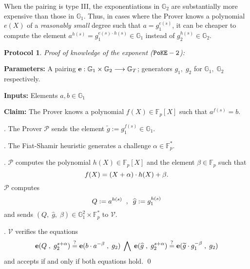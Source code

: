 \documentclass[11pt, lettersize, notitlepage, leqno, footskip=0.6cm]{article}
\newcommand{\bFp}{\mathbb{F}_p}
\newcommand{\bG}{\mathbb{G}}
\newcommand{\lra}{\longrightarrow}
\newcommand{\wti}{\widetilde}
\newcommand{\mc}{\mathcal}
\newcommand{\mb}{\mathbb}
\newcommand{\al}{\alpha}
\newcommand{\be}{\beta}
\newcommand{\what}{\widehat}
\newcommand{\mP}{\mc{P}}
\newcommand{\V}{\mc{V}}
\newcommand{\vs}{\vspace{-0.15cm}}
\newcommand{\noin}{\noindent}
\newcommand{\sta}{\stackrel{?}{=}}
\newtheorem{Prot}[Thm]{Protocol}
\numberwithin{equation}{section}
\begin{document}
\bigskip

When the pairing is type III, the exponentiations in $\mb{G}_2$ are substantially more expensive than those in $\mb{G}_1$. Thus, in cases where the Prover knows a polynomial $e(X)$ of a \textit{reasonably small} degree such that $a = g_1^{e(s)}$, it can be cheaper to compute the element $a^{h(s)} = g_1^{e(s)\cdot h(s)}\in \mb{G}_1$ instead of $g_2^{h(s)}\in \mb{G}_2$.




\vspace{2mm}



\begin{mdframed}

\begin{Prot} \normalfont \hypertarget{PoKE}{\textit{Proof of knowledge of the exponent}} (${\tt{PoKE-2}}$):\end{Prot} 

\noin \textbf{Parameters:} A pairing ${\bf{e}}:\mb{G}_1\times \mb{G}_2\lra \mb{G}_T$; generators $g_1,\;g_2$ for $\mb{G}_1,\; \mb{G}_2$ respectively.


\noin \textbf{Inputs:} Elements $a, b\in \mb{G}_1$

\noin \textbf{Claim:} The Prover knows a polynomial $f(X)\in \bFp[X]$ such that $a^{f(s)} = b$.\vspace{1mm}

\noin {}. The Prover $\mP$ sends the element $\wti{g}:= g_1^{f(s)}\in \bG_1$.\vspace{1mm} 

\noin 2. The Fiat-Shamir heuristic generates a challenge $\al\in \bFp^*$. \vspace{1mm}

\noin 3. $\mP$ computes the polynomial $h(X)\in \bFp[X]$ and the element $\be\in \bFp$ such that \vs $$f(X) = (X+\al)\cdot h(X)+ \be. \vs $$ $\mP$ computes \vs $$Q:= a^{h(s)}\;\;,\;\;\what{g}:= g_1^{h(s)}\vs $$ and sends $(Q,\;\what{g},\;\be)\in \mb{G}_1^2\times \bFp^*$ to $\V$. \vspace{1mm}

\noin 4. $\V$ verifies the equations \vs $$\mathbf{e}(Q\;, \;g_2^{s+\al}) \sta \mathbf{e}(b\cdot a^{-\be}\;,\; g_2)\;\bigwedge\;\mathbf{e}(\what{g}\;,\; g_2^{s+\al}) \sta \mathbf{e}(\wti{g}\cdot g_1^{-\be}\;,\; g_2) \vs $$ and accepts if and only if both equations hold. \qed \end{mdframed}



\bigskip
\end{document}
